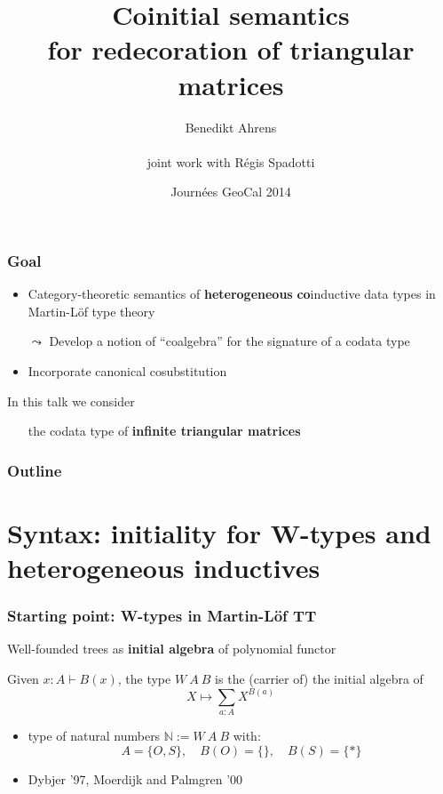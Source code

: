 \documentclass[
]
{beamer}
\title[Coinitial semantics for redecoration]{Coinitial semantics \\ for redecoration of triangular matrices}
\author[B.\ Ahrens and R.\ Spadotti]{Benedikt Ahrens \\~\\ joint work with R\'egis Spadotti}
\date[2014-03-24/25]{Journées GeoCal 2014}
\institute[IRIT] %
{%
  Institut de Recherche en Informatique de Toulouse\\
   Universit\'e Paul Sabatier\\ ~ \\
}
\newcommand{\fat}[1]{\textbf{#1}}
\begin{document}
\begin{frame}
 \titlepage
\end{frame}


\begin{frame}
 \frametitle{Goal}
 
   \begin{itemize}\setlength{\itemsep}{1em}
    \item Category-theoretic semantics of \fat{heterogeneous} \fat{co}inductive data types
          in Martin-L\"of type theory
    \item [$\leadsto$] Develop a notion of \enquote{coalgebra} for the signature of a codata type
    \item Incorporate canonical cosubstitution
   \end{itemize}

  \begin{block}{In this talk we consider}
   \begin{itemize}
    \item []  the codata type of \fat{infinite triangular matrices}
   \end{itemize}
  \end{block}

 
\end{frame}


\begin{frame}
 \frametitle{Outline}
 \tableofcontents
\end{frame}


\section{Syntax: initiality for W-types and heterogeneous inductives}

\begin{frame}
 \frametitle{Starting point: W-types in Martin-L\"of TT}
 
  
 \begin{block}{Well-founded trees as \fat{initial algebra} of polynomial functor}
 
   Given $x : A \vdash B(x)$, the type $W~A~B$ is the (carrier of) the initial algebra of
    \[X \mapsto \sum_{a:A}X^{B(a)} \]
 
  \begin{itemize}
   \item type of natural numbers $\mathbb{N} := W~A~B$ with: \[A = \{O,S\}, \quad B(O) = \{\}, \quad B(S)=\{*\}\]
   \item Dybjer '97, Moerdijk and Palmgren '00
  \end{itemize}
 \end{block}
\end{frame}
\end{document}
